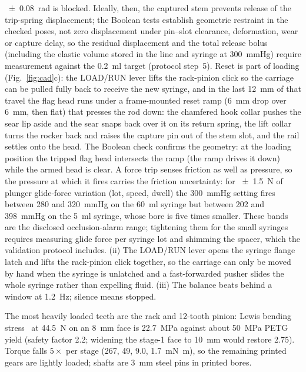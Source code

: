 \documentclass[11pt,a4paper]{article}
\begin{document}
\SI{\pm 0.08}{\radian} is blocked. Ideally, then, the captured stem prevents release of the trip-spring displacement; the Boolean tests establish geometric restraint in the checked poses, not zero displacement under pin--slot clearance, deformation, wear or capture delay, so the residual displacement and the total release bolus (including the elastic volume stored in the line and syringe at \SI{300}{mmHg}) require measurement against the \SI{0.2}{\milli\litre} target (protocol step~5). Reset is part of loading (Fig.~\ref{fig:cad}c): the LOAD/RUN lever lifts the rack-pinion click so the carriage can be pulled fully back to receive the new syringe, and in the last \SI{12}{\milli\metre} of that travel the flag head runs under a frame-mounted reset ramp (\SI{6}{\milli\metre} drop over \SI{6}{\milli\metre}, then flat) that presses the rod down: the chamfered hook collar pushes the sear lip aside and the sear snaps back over it on its return spring, the lift collar turns the rocker back and raises the capture pin out of the stem slot, and the rail settles onto the head. The Boolean check confirms the geometry: at the loading position the tripped flag head intersects the ramp (the ramp drives it down) while the armed head is clear. A force trip senses friction as well as pressure, so the pressure at which it fires carries the friction uncertainty: for \SI{\pm 1.5}{\newton} of plunger glide-force variation (lot, speed, dwell) the \SI{300}{mmHg} setting fires between 280 and \SI{320}{mmHg} on the \SI{60}{\milli\litre} syringe but between 202 and \SI{398}{mmHg} on the \SI{5}{\milli\litre} syringe, whose bore is five times smaller. These bands are the disclosed occlusion-alarm range; tightening them for the small syringes requires measuring glide force per syringe lot and shimming the spacer, which the validation protocol includes. (ii) The LOAD/RUN lever opens the syringe flange latch and lifts the rack-pinion click together, so the carriage can only be moved by hand when the syringe is unlatched and a fast-forwarded pusher slides the whole syringe rather than expelling fluid. (iii) The balance beats behind a window at \SI{1.2}{\hertz}; silence means stopped.

The most heavily loaded teeth are the rack and 12-tooth pinion: Lewis bending stress~\cite{lewis} at \SI{44.5}{\newton} on an \SI{8}{\milli\metre} face is \SI{22.7}{\mega\pascal} against about \SI{50}{\mega\pascal} PETG yield (safety factor 2.2; widening the stage-1 face to \SI{10}{\milli\metre} would restore 2.75). Torque falls $5\times$ per stage (267, 49, 9.0, \SI{1.7}{\milli\newton\metre}), so the remaining printed gears are lightly loaded; shafts are \SI{3}{\milli\metre} steel pins in printed bores.
\end{document}
